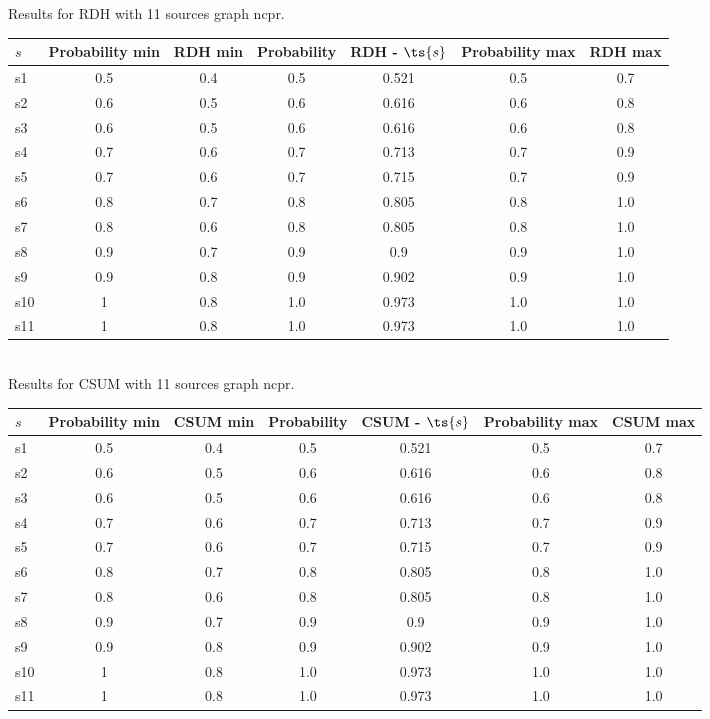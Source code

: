 \documentclass{article}
\begin{document}
\noindent Results for RDH with 11 sources graph ncpr.

\noindent\begin{tabular}{|l|c|c|c|c|c|c|}
\hline
$s$& Probability min & RDH min & Probability & RDH - $\ts{s}$ & Probability max & RDH max\\
\hline
s1 &0.5 & 0.4 & 0.5 & 0.521 & 0.5 & 0.7\\
\hline
s2 &0.6 & 0.5 & 0.6 & 0.616 & 0.6 & 0.8\\
\hline
s3 &0.6 & 0.5 & 0.6 & 0.616 & 0.6 & 0.8\\
\hline
s4 &0.7 & 0.6 & 0.7 & 0.713 & 0.7 & 0.9\\
\hline
s5 &0.7 & 0.6 & 0.7 & 0.715 & 0.7 & 0.9\\
\hline
s6 &0.8 & 0.7 & 0.8 & 0.805 & 0.8 & 1.0\\
\hline
s7 &0.8 & 0.6 & 0.8 & 0.805 & 0.8 & 1.0\\
\hline
s8 &0.9 & 0.7 & 0.9 & 0.9 & 0.9 & 1.0\\
\hline
s9 &0.9 & 0.8 & 0.9 & 0.902 & 0.9 & 1.0\\
\hline
s10 &1 & 0.8 & 1.0 & 0.973 & 1.0 & 1.0\\
\hline
s11 &1 & 0.8 & 1.0 & 0.973 & 1.0 & 1.0\\
\hline
\end{tabular}\\

\noindent Results for CSUM with 11 sources graph ncpr.

\noindent\begin{tabular}{|l|c|c|c|c|c|c|}
\hline
$s$& Probability min & CSUM min & Probability & CSUM - $\ts{s}$ & Probability max & CSUM max\\
\hline
s1 &0.5 & 0.4 & 0.5 & 0.521 & 0.5 & 0.7\\
\hline
s2 &0.6 & 0.5 & 0.6 & 0.616 & 0.6 & 0.8\\
\hline
s3 &0.6 & 0.5 & 0.6 & 0.616 & 0.6 & 0.8\\
\hline
s4 &0.7 & 0.6 & 0.7 & 0.713 & 0.7 & 0.9\\
\hline
s5 &0.7 & 0.6 & 0.7 & 0.715 & 0.7 & 0.9\\
\hline
s6 &0.8 & 0.7 & 0.8 & 0.805 & 0.8 & 1.0\\
\hline
s7 &0.8 & 0.6 & 0.8 & 0.805 & 0.8 & 1.0\\
\hline
s8 &0.9 & 0.7 & 0.9 & 0.9 & 0.9 & 1.0\\
\hline
s9 &0.9 & 0.8 & 0.9 & 0.902 & 0.9 & 1.0\\
\hline
s10 &1 & 0.8 & 1.0 & 0.973 & 1.0 & 1.0\\
\hline
s11 &1 & 0.8 & 1.0 & 0.973 & 1.0 & 1.0\\
\hline
\end{tabular}\\
\end{document}
